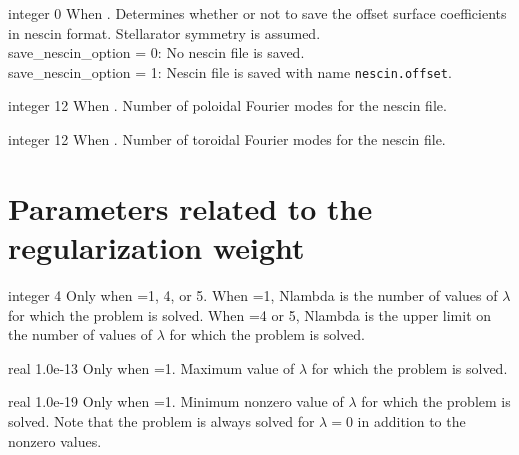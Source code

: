 \myhrule

{integer}
{0}
{When .}
{Determines whether or not to save the offset surface coefficients in nescin format. Stellarator symmetry is assumed. \\
{\ttfamily save\_nescin\_option} = 0: No nescin file is saved. \\
{\ttfamily save\_nescin\_option} = 1: Nescin file is saved with name \texttt{nescin.offset}. }

\myhrule

{integer}
{12}
{When . }
{Number of poloidal Fourier modes for the nescin file.}

\myhrule

{integer}
{12}
{When .}
{Number of toroidal Fourier modes for the nescin file.}


\section{Parameters related to the regularization weight}

{integer}
{4}
{Only when =1, 4, or 5.}
{When =1, {\ttfamily Nlambda} is the number of values of $\lambda$ for which the problem is solved.
When =4 or 5, {\ttfamily Nlambda} is the upper limit on the number of values of $\lambda$ for which the problem is solved.}

\myhrule

{real}
{1.0e-13}
{Only when =1.}
{Maximum value of $\lambda$ for which the problem is solved.}

\myhrule

{real}
{1.0e-19}
{Only when =1.}
{Minimum nonzero value of $\lambda$ for which the problem is solved.
Note that the problem is always solved for $\lambda=0$ in addition to
the nonzero values.}

\myhrule

